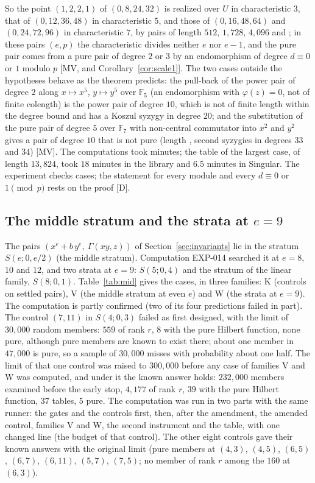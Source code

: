 \documentclass[11pt]{article}
\theoremstyle{definition}
\theoremstyle{remark}
\newcommand{\EXP}[1]{\mbox{EXP-#1}}
\newcommand{\F}{\mathbb{F}}
\begin{document}
So the point $(1,2,2,1)$ of $(0,8,24,32)$ is realized over $U$ in characteristic $3$, that of $(0,12,36,48)$ in characteristic $5$, and those of $(0,16,48,64)$ and $(0,24,72,96)$ in characteristic $7$, by pairs of length $512$, $1{,}728$, $4{,}096$ and \npbMaxLength{}; in these pairs $(e,p)$ the characteristic divides neither $e$ nor $e-1$, and the pure pair comes from a pure pair of degree $2$ or $3$ by an endomorphism of degree $d\equiv0$ or $1$ modulo $p$ [MV, and Corollary~\ref{cor:scale1}]. The two cases outside the hypotheses behave as the theorem predicts: the pull-back of the power pair of degree $2$ along $x\mapsto x^5$, $y\mapsto y^5$ over $\F_5$ (an endomorphism with $\varphi(z)=0$, not of finite colength) is the power pair of degree $10$, which is not of finite length within the degree bound and has a Koszul syzygy in degree $20$; and the substitution of the pure pair of degree $5$ over $\F_7$ with non-central commutator into $x^2$ and $y^2$ gives a pair of degree $10$ that is not pure (length \npbNTwoLength{}, second syzygies in degrees $33$ and $34$) [MV]. The computations took \npbSeconds{} minutes; the table of the largest case, of length $13{,}824$, took $18$ minutes in the library and $6.5$ minutes in Singular. The experiment checks cases; the statement for every module and every $d\equiv0$ or $1\pmod p$ rests on the proof [D].

\subsection{The middle stratum and the strata at \texorpdfstring{$e=9$}{e=9}}
\label{sec:resmid}

The pairs $(x^e+b\,y^e,\ \Gamma(xy,z))$ of Section~\ref{sec:invariants} lie in the stratum $S(e;0,e/2)$ (the middle stratum). Computation \EXP{014} searched it at $e=8$, $10$ and $12$, and two strata at $e=9$: $S(5;0,4)$ and the stratum of the linear family, $S(8;0,1)$. Table~\ref{tab:mid} gives the cases, in three families: K (controls on settled pairs), V (the middle stratum at even $e$) and W (the strata at $e=9$). The computation is partly confirmed (two of its four predictions failed in part). The control $(7,11)$ in $S(4;0,3)$ failed as first designed, with the limit of $30{,}000$ random members: $559$ of rank $r$, $8$ with the pure Hilbert function, none pure, although pure members are known to exist there; about one member in $47{,}000$ is pure, so a sample of $30{,}000$ misses with probability about one half. The limit of that one control was raised to $300{,}000$ before any case of families V and W was computed, and under it the known answer holds: $232{,}000$ members examined before the early stop, $4{,}177$ of rank $r$, $39$ with the pure Hilbert function, $37$ tables, $5$ pure. The computation was run in two parts with the same runner: the gates and the controls first, then, after the amendment, the amended control, families V and W, the second instrument and the table, with one changed line (the budget of that control). The other eight controls gave their known answers with the original limit (pure members at $(4,3)$, $(4,5)$, $(6,5)$, $(6,7)$, $(6,11)$, $(5,7)$, $(7,5)$; no member of rank $r$ among the $160$ at $(6,3)$).
\end{document}
